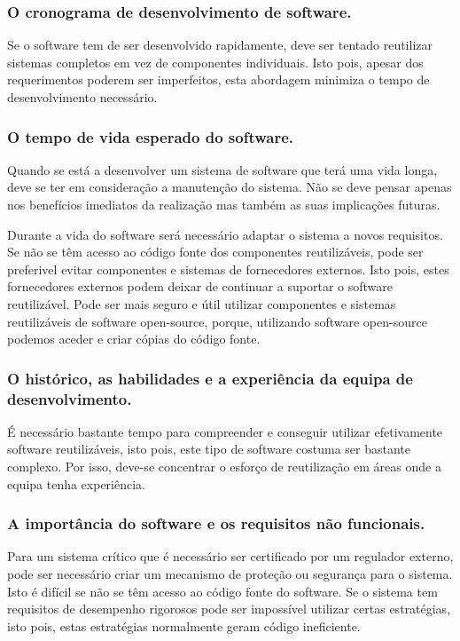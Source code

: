 \documentclass[runningheads]{llncs}
\begin{document}
\subsubsection{O cronograma de desenvolvimento de software.}

Se o software tem de ser desenvolvido rapidamente, deve ser tentado reutilizar sistemas completos em vez de componentes individuais. Isto pois, apesar dos requerimentos poderem ser imperfeitos, esta abordagem minimiza o tempo de desenvolvimento necessário.

\subsubsection{O tempo de vida esperado do software.}

Quando se está a desenvolver um sistema de software que terá uma vida longa, deve se ter em consideração a manutenção do sistema. Não se deve pensar apenas nos benefícios imediatos da realização mas também as suas implicações futuras. \par
Durante a vida do software será necessário adaptar o sistema a novos requisitos. Se não se têm acesso ao código fonte dos componentes reutilizáveis, pode ser preferivel evitar componentes e sistemas de fornecedores externos. Isto pois, estes fornecedores externos podem deixar de continuar a suportar o software reutilizável. Pode ser mais seguro e útil utilizar componentes e sistemas reutilizáveis de software open-source, porque, utilizando software open-source podemos aceder e criar cópias do código fonte.

\subsubsection{O histórico, as habilidades e a experiência da equipa de desenvolvimento.}

É necessário bastante tempo para compreender e conseguir utilizar efetivamente software reutilizáveis, isto pois, este tipo de software costuma ser bastante complexo. Por isso, deve-se concentrar o esforço de reutilização em áreas onde a equipa tenha experiência.

\subsubsection{A importância do software e os requisitos não funcionais.}

Para um sistema crítico que é necessário ser certificado por um regulador externo, pode ser necessário criar um mecanismo de proteção ou segurança para o sistema. Isto é difícil se não se têm acesso ao código fonte do software. Se o sistema tem requisitos de desempenho rigorosos pode ser impossível utilizar certas estratégias, isto pois, estas estratégias normalmente geram código ineficiente. 
\end{document}
